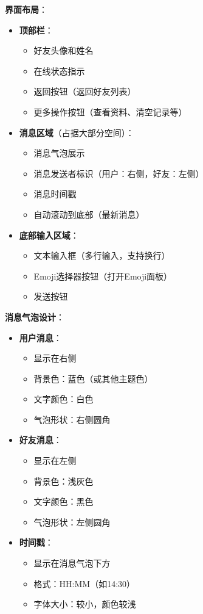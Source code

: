 \documentclass[12pt,a4paper]{article}
\begin{document}
\textbf{界面布局}：
\begin{itemize}
    \item \textbf{顶部栏}：
        \begin{itemize}
            \item 好友头像和姓名
            \item 在线状态指示
            \item 返回按钮（返回好友列表）
            \item 更多操作按钮（查看资料、清空记录等）
        \end{itemize}
    
    \item \textbf{消息区域}（占据大部分空间）：
        \begin{itemize}
            \item 消息气泡展示
            \item 消息发送者标识（用户：右侧，好友：左侧）
            \item 消息时间戳
            \item 自动滚动到底部（最新消息）
        \end{itemize}
    
    \item \textbf{底部输入区域}：
        \begin{itemize}
            \item 文本输入框（多行输入，支持换行）
            \item Emoji选择器按钮（打开Emoji面板）
            \item 发送按钮
        \end{itemize}
\end{itemize}

\textbf{消息气泡设计}：
\begin{itemize}
    \item \textbf{用户消息}：
        \begin{itemize}
            \item 显示在右侧
            \item 背景色：蓝色（或其他主题色）
            \item 文字颜色：白色
            \item 气泡形状：右侧圆角
        \end{itemize}
    \item \textbf{好友消息}：
        \begin{itemize}
            \item 显示在左侧
            \item 背景色：浅灰色
            \item 文字颜色：黑色
            \item 气泡形状：左侧圆角
        \end{itemize}
    \item \textbf{时间戳}：
        \begin{itemize}
            \item 显示在消息气泡下方
            \item 格式：HH:MM（如14:30）
            \item 字体大小：较小，颜色较浅
        \end{itemize}
\end{itemize}
\end{document}
